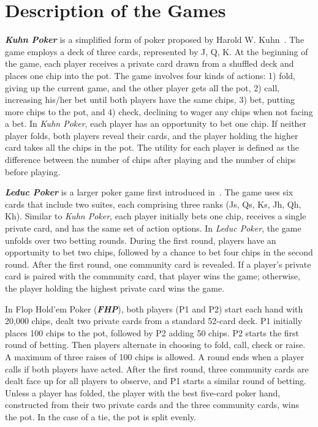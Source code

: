 \documentclass[letterpaper]{article} %
\begin{document}
\section{Description of the Games}
\label{app:games}
\textbf{\textit{Kuhn Poker}} is a simplified form of poker proposed by Harold W. Kuhn~\cite{kuhn1950simplified}. 
The game employs a deck of three cards, represented by J, Q, K. 
At the beginning of the game, each player receives a private card drawn from a shuffled deck and places one chip into the pot.
The game involves four kinds of actions: 1) fold, giving up the current game, and the other player gets all the pot, 2) call, increasing his/her bet until both players have the same chips, 3) bet, putting more chips to the pot, and 4) check, declining to wager any chips when not facing a bet. 
In \textit{Kuhn Poker}, each player has an opportunity to bet one chip. 
If neither player folds, both players reveal their cards, and the player holding the higher card takes all the chips in the pot.
The utility for each player is defined as the difference between the number of chips after playing and the number of chips before playing.

\textbf{\textit{Leduc Poker}} is a larger poker game first introduced in~\cite{southey2005bayes}. 
The game uses six cards that include two suites, each comprising three ranks (Js, Qs, Ks, Jh, Qh, Kh).
Similar to \textit{Kuhn Poker}, each player initially bets one chip, receives a single private card, and has the same set of action options. 
In \textit{Leduc Poker}, the game unfolds over two betting rounds. 
During the first round, players have an opportunity to bet two chips, followed by a chance to bet four chips in the second round. 
After the first round, one community card is revealed.
If a player’s private card is paired with the community card, that player wins the game; otherwise, the player holding the highest private card wins the game.

In Flop Hold'em Poker (\textit{\textbf{FHP}}), both players (P1 and P2) start each hand with 20,000 chips, dealt two private cards from a standard 52-card deck.
P1 initially places 100 chips to the pot, followed by P2 adding 50 chips.
P2 starts the first round of betting.
Then players alternate in choosing to fold, call, check or raise.
A maximum of three raises of 100 chips is allowed.
A round ends when a player calls if both players have acted.
After the first round, three community cards are dealt face up for all players to observe, and P1 starts a similar round of betting.
Unless a player has folded, the player with the best five-card poker hand, constructed from their two private cards and the three community cards, wins the pot.
In the case of a tie, the pot is split evenly.
\end{document}

